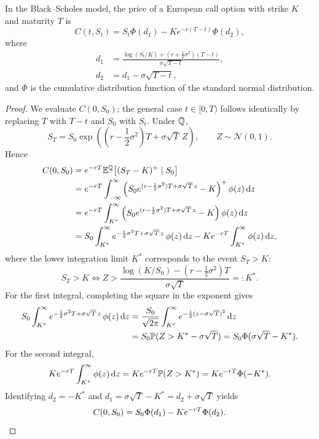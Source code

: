 \begin{theorem}
    \label{thm:ch04-bs-formula}
    In the Black--Scholes model, the price of a European call option with strike $K$ and maturity $T$ is
    \[
        C(t, S_t) = S_t \Phi(d_1) - K e^{-r(T-t)} \Phi(d_2),
    \]
    where
    \begin{align*}
        d_1 &= \frac{\log(S_t / K) + \left(r + \frac{1}{2}\sigma^2\right)(T - t)}{\sigma\sqrt{T - t}}, \\
        d_2 &= d_1 - \sigma\sqrt{T - t},
    \end{align*}
    and $\Phi$ is the cumulative distribution function of the standard normal distribution.
\end{theorem}
\begin{proof}
    We evaluate $C(0, S_0)$; the general case $t \in [0, T)$ follows identically by replacing $T$ with $T - t$ and $S_0$ with $S_t$. Under $\mathbb{Q}$,
    \[
        S_T = S_0 \exp\!\left(\left(r - \frac{1}{2}\sigma^2\right)T + \sigma\sqrt{T}\,Z\right), \qquad Z \sim \mathcal{N}(0, 1).
    \]
    Hence
    \begin{align*}
        C(0, S_0)
        &= e^{-rT}\mathbb{E}^{\mathbb{Q}}\bigl[(S_T - K)^+ \mid S_0\bigr] \\
        &= e^{-rT}\int_{-\infty}^{\infty} \left(S_0 e^{(r - \frac{1}{2}\sigma^2)T + \sigma\sqrt{T}\,z} - K\right)^+ \phi(z)\,\mathrm{d} z \\
        &= e^{-rT}\int_{K^*}^{\infty} \left(S_0 e^{(r - \frac{1}{2}\sigma^2)T + \sigma\sqrt{T}\,z} - K\right) \phi(z)\,\mathrm{d} z \\
        &= S_0 \int_{K^*}^{\infty} e^{-\frac{1}{2}\sigma^2 T + \sigma\sqrt{T}\,z}\,\phi(z)\,\mathrm{d} z
        - K e^{-rT}\int_{K^*}^{\infty} \phi(z)\,\mathrm{d} z,
    \end{align*}
    where the lower integration limit $K^*$ corresponds to the event $S_T > K$:
    \[
        S_T > K \iff Z > \frac{\log(K / S_0) - \left(r - \frac{1}{2}\sigma^2\right)T}{\sigma\sqrt{T}} =: K^*.
    \]
    For the first integral, completing the square in the exponent gives
    \begin{align*}
        S_0 \int_{K^*}^{\infty} e^{-\frac{1}{2}\sigma^2 T + \sigma\sqrt{T}\,z}\,\phi(z)\,\mathrm{d} z
        &= \frac{S_0}{\sqrt{2\pi}} \int_{K^*}^{\infty} e^{-\frac{1}{2}(z - \sigma\sqrt{T})^2}\,\mathrm{d} z \\
        &= S_0 \mathbb{P}(Z > K^* - \sigma\sqrt{T})
        = S_0 \Phi(\sigma\sqrt{T} - K^*).
    \end{align*}
    For the second integral,
    \[
        K e^{-rT}\int_{K^*}^{\infty} \phi(z)\,\mathrm{d} z
        = K e^{-rT}\mathbb{P}(Z > K^*)
        = K e^{-rT}\Phi(-K^*).
    \]
    Identifying $d_2 = -K^*$ and $d_1 = \sigma\sqrt{T} - K^* = d_2 + \sigma\sqrt{T}$ yields
    \[
        C(0, S_0) = S_0 \Phi(d_1) - K e^{-rT}\Phi(d_2). \qedhere
    \]
\end{proof}

